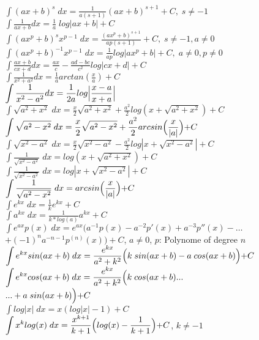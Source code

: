 \documentclass[]{article}
\newcommand{\mathlarger}[1]{\displaystyle#1}
\begin{document}
\begin{multicols*}{3}
$\mathlarger{\int (ax+b)^s\;dx= \frac{1}{a(s+1)}(ax+b)^{s+1} + C,\;s\neq -1}$\\
$\mathlarger{\int \frac{1}{ax+b}dx=\frac{1}{a}\;log|ax+b|+C}$\\
$\mathlarger{\int (ax^p+b)^sx^{p-1}\;dx = \frac{(ax^p+b)^{s+1}}{ap(s+1)}+C,\;s\neq -1, a \neq 0}$\\
$\mathlarger{\int (ax^p+b)^{-1}x^{p-1}\;dx=\frac{1}{ap}log|ax^p+b|+C,\;a\neq 0,p\neq 0}$\\
$\mathlarger{\int \frac{ax+b}{cx+d}dx=\frac{ax}{c}- \frac{ad-bc}{c^2} log|cx+d|+C}$\\
$\mathlarger{\int \frac{1}{x^2+a^2}dx=\frac{1}{a}arctan(\frac{x}{a})+C}$\\
$\mathlarger{\int \frac{1}{x^2-a^2}dx=\frac{1}{2a}log\Bigl|\frac{x-a}{x+a}\Bigl|}$\\
$\mathlarger{\int \sqrt{a^2+x^2}\;dx=\frac{x}{2}\sqrt{a^2+x^2}+\frac{a^2}{2} log(x+\sqrt{a^2+x^2})+C}$\\
$\mathlarger{\int \sqrt{a^2-x^2}\;dx= \frac{x}{2}\sqrt{a^2-x^2}+\frac{a^2}{2}arcsin\Bigl(\frac{x}{|a|}\Bigl)+C}$\\
$\mathlarger{\int \sqrt{x^2-a^2}\;dx= \frac{x}{2}\sqrt{x^2-a^2}-\frac{a^2}{2}log|x+\sqrt{x^2-a^2}|+C}$\\
$\mathlarger{\int \frac{1}{\sqrt{x^2-a^2}}\;dx=log(x+\sqrt{a^2+x^2})+C}$\\
$\mathlarger{\int \frac{1}{\sqrt{x^2-a^2}}\;dx=log|x+\sqrt{x^2-a^2}|+C}$\\
$\mathlarger{\int \frac{1}{\sqrt{a^2-x^2}}\;dx=arcsin\Bigl(\frac{x}{|a|}\Bigl)+C}$\\
$\mathlarger{\int e^{kx}\;dx=\frac{1}{k}e^{kx}+C}$\\
$\mathlarger{\int a^{kx}\;dx=\frac{1}{k*log(a)}a^{kx}+C}$\\
$\mathlarger{\int e^{ax}p(x)\;dx=e^{ax}(a^{-1}p(x)-a^{-2}p'(x)+a^{-3}p''(x)-\dots}$\\
$\mathlarger{+(-1)^na^{-n-1}p^{(n)}(x))+C}$, $a\neq 0$, $p$: Polynome of degree $n$\\
$\mathlarger{\int e^{kx}sin(ax+b)\;dx=\frac{e^{kx}}{a^2+k^2}\Bigl(k\;sin(ax+b)- a\;cos(ax+b)\Bigl)+C}$\\
$\mathlarger{\int e^{kx}cos(ax+b)\;dx=\frac{e^{kx}}{a^2 + k^2}\Bigl(k\;cos(ax+b)...}$\\
$\mathlarger{...+a\;sin(ax+b)\Bigl)+C}$\\
$\mathlarger{\int log|x|\;dx= x(log|x|-1)+C}$\\
$\mathlarger{\int x^k log(x)\;dx=\frac{x^{k+1}}{k+1}\Bigl(log(x)-\frac{1}{k+1}\Bigl)+C}$, $k\neq -1$\\

\end{multicols*}
\end{document}
